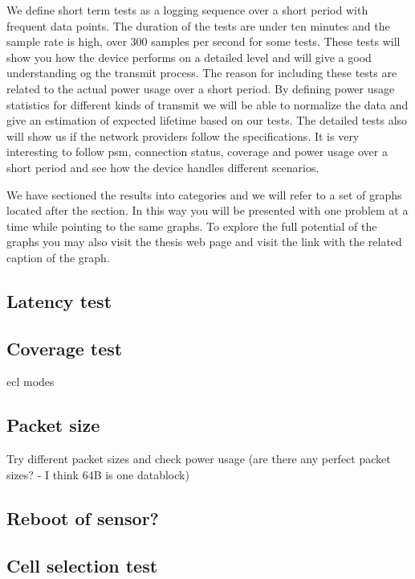 \documentclass[USenglish]{ifimaster}  %
\begin{document}
We define short term tests as a logging sequence over a short period with frequent data points. The duration of the tests are under ten minutes and the sample rate is high, over 300 samples per second for some tests. These tests will show you how the device performs on a detailed level and will give a good understanding og the transmit process. The reason for including these tests are related to the actual power usage over a short period. By defining power usage statistics for different kinds of transmit we will be able to normalize the data and give an estimation of expected lifetime based on our tests. The detailed tests also will show us if the network providers follow the specifications. It is very interesting to follow \acrshort{psm}, connection status, coverage and power usage over a short period and see how the device handles different scenarios.

We have sectioned the results into categories and we will refer to a set of graphs located after the section. In this way you will be presented with one problem at a time while pointing to the same graphs. To explore the full potential of the graphs you may also visit the thesis web page\cite{url:thesispage} and visit the link with the related caption of the graph.

\subsection{Latency test} \label{ssection:latencytest}

\subsection{Coverage test} \label{ssection:coveragetest}
\acrshort{ecl} modes

\subsection{Packet size} \label{ssection:packetsize}
Try different packet sizes and check power usage (are there any perfect packet sizes? - I think 64B is one datablock)

\subsection{Reboot of sensor?} \label{ssection:reboottest}

\subsection{Cell selection test} \label{ssection:cellselectiontest}
\end{document}
